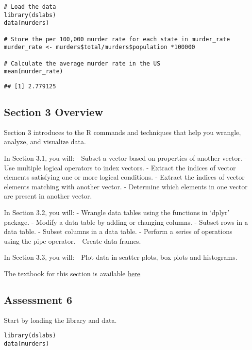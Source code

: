 \documentclass[
]{article}
\begin{document}
\begin{verbatim}
# Load the data
library(dslabs)
data(murders)

# Store the per 100,000 murder rate for each state in murder_rate
murder_rate <- murders$total/murders$population *100000

# Calculate the average murder rate in the US 
mean(murder_rate)
\end{verbatim}

\begin{verbatim}
## [1] 2.779125
\end{verbatim}

\hypertarget{section-3-overview}{%
\subsection{Section 3 Overview}\label{section-3-overview}}

Section 3 introduces to the R commands and techniques that help you
wrangle, analyze, and visualize data.

In Section 3.1, you will: - Subset a vector based on properties of
another vector. - Use multiple logical operators to index vectors. -
Extract the indices of vector elements satisfying one or more logical
conditions. - Extract the indices of vector elements matching with
another vector. - Determine which elements in one vector are present in
another vector.

In Section 3.2, you will: - Wrangle data tables using the functions in
`dplyr' package. - Modify a data table by adding or changing columns. -
Subset rows in a data table. - Subset columns in a data table. - Perform
a series of operations using the pipe operator. - Create data frames.

In Section 3.3, you will: - Plot data in scatter plots, box plots and
histograms.

The textbook for this section is available
\href{https://rafalab.github.io/dsbook/r-basics.html\#indexing}{here}

\hypertarget{assessment-6}{%
\subsection{Assessment 6}\label{assessment-6}}

Start by loading the library and data.

\begin{verbatim}
library(dslabs)
data(murders)
\end{verbatim}
\end{document}
